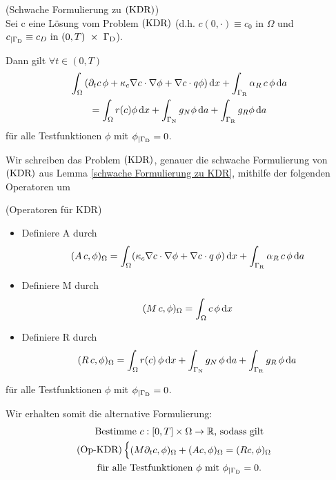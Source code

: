 \begin{Lemma} \label{schwache Formulierung zu KDR}
	(Schwache Formulierung zu $ \operatorname{(KDR)} $)\\
	Sei c eine Lösung vom Problem $ \operatorname{(KDR)} $ (d.h. $ c(0,\cdot) \equiv c_0 \text{ in } \Omega $ und $ c_{|\Gamma_{\text{D}}} \equiv c_D \text{ in } (0,T)~\times~\Gamma_{\text{D}} $).
	
	Dann gilt $ \forall t \in (0,T) $
	\begin{gather*}
		\int_\Omega \left( \partial_t c \, \phi + \kappa_c \nabla c \cdot \nabla \phi + \nabla c \cdot q \phi \right) \mathop{}\!\mathrm{d} x + \int_{\Gamma_{\text{R}}} \alpha_R \, c \, \phi \mathop{}\!\mathrm{d} a\\ = \int_\Omega r(c) \phi \mathop{}\!\mathrm{d} x + \int_{\Gamma_{\text{N}}} g_N \phi \mathop{}\!\mathrm{d} a + \int_{\Gamma_{\text{R}}} g_R \phi \mathop{}\!\mathrm{d} a
	\end{gather*}
	für alle Testfunktionen $ \phi $  mit $ \phi_{|\Gamma_{\text{D}}} = 0 $.
\end{Lemma}

Wir schreiben das Problem $ \operatorname{(KDR)} $, genauer die schwache Formulierung von $ \operatorname{(KDR)} $ aus Lemma \ref{schwache Formulierung zu KDR}, mithilfe der folgenden Operatoren um
\begin{define}(Operatoren für KDR)
	\begin{itemize}
		\item Definiere A durch
		\[ (A\, c , \phi)_\Omega = \int_\Omega (\kappa_c \nabla c \cdot \nabla \phi + \nabla c \cdot q \, \phi ) \mathop{}\!\mathrm{d} x + \int_{\Gamma_{\text{R}}} \alpha_R \, c \, \phi \mathop{}\!\mathrm{d} a  \]
		\item Definiere M durch
		\[ (M \, c, \phi)_\Omega = \int_\Omega c \, \phi \mathop{}\!\mathrm{d} x \]
		\item Definiere R durch
		\[ (R\, c, \phi)_\Omega = \int_\Omega r(c) \, \phi \mathop{}\!\mathrm{d} x + \int_{\Gamma_{\text{N}}} g_N \, \phi \mathop{}\!\mathrm{d} a + \int_{\Gamma_{\text{R}}} g_R \, \phi \mathop{}\!\mathrm{d} a \]
	\end{itemize}
	für alle Testfunktionen $ \phi $ mit $ \phi_{|\Gamma_{\text{D}}} = 0 $.
\end{define}

Wir erhalten somit die alternative Formulierung:
\begin{gather*}
	\text{Bestimme } c:[0,T] \times \Omega \to \mathbb{R} \text{, sodass gilt}\\
	\operatorname{(Op-KDR)}\begin{cases}
		(M \partial_t c, \phi)_\Omega + (A c, \phi)_\Omega = (R c, \phi)_\Omega 
	\end{cases}\\
	\text{für alle Testfunktionen } \phi \text{ mit } \phi_{|\Gamma_{\text{D}}} = 0.
\end{gather*}

